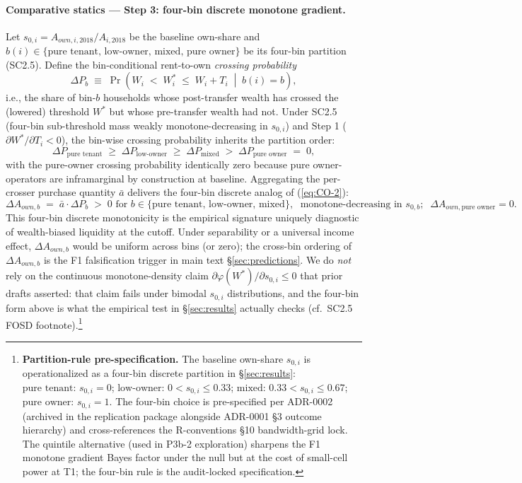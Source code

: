 \documentclass[11pt, a4paper]{article}
\begin{document}
\paragraph{Comparative statics --- Step 3: four-bin discrete monotone gradient.}
Let $s_{0,i} = A_{own,i,2018}/A_{i,2018}$ be the baseline own-share and
$b(i) \in \{\text{pure tenant},\, \text{low-owner},\, \text{mixed},\, \text{pure owner}\}$
be its four-bin partition (SC2.5). Define the bin-conditional rent-to-own
\emph{crossing probability}
\[
\Delta P_b \;\equiv\; \Pr\!\left(W_i \;<\; W_i^* \;\le\; W_i + T_i \;\middle|\; b(i) = b\right),
\]
i.e., the share of bin-$b$ households whose post-transfer wealth has crossed
the (lowered) threshold $W^*$ but whose pre-transfer wealth had not. Under
SC2.5 (four-bin sub-threshold mass weakly monotone-decreasing in $s_{0,i}$)
and Step 1 ($\partial W^*/\partial T_i < 0$), the bin-wise crossing
probability inherits the partition order:
\begin{equation}
\Delta P_{\text{pure tenant}} \;\ge\; \Delta P_{\text{low-owner}}
\;\ge\; \Delta P_{\text{mixed}} \;>\; \Delta P_{\text{pure owner}} \;=\; 0,
\label{eq:appB-step3-prob}
\end{equation}
with the pure-owner crossing probability identically zero because pure
owner-operators are inframarginal by construction at baseline. Aggregating
the per-crosser purchase quantity $\bar a$ delivers the four-bin discrete
analog of (\ref{eq:CO-2}):
\begin{equation}
\boxed{\Delta A_{own,b} \;=\; \bar a \cdot \Delta P_b \;>\; 0
  \text{ for } b \in \{\text{pure tenant},\, \text{low-owner},\, \text{mixed}\},
  \;\text{ monotone-decreasing in } s_{0,b};\;\;
  \Delta A_{own,\text{pure owner}} = 0.}
\label{eq:appB-step3}
\end{equation}
This four-bin discrete monotonicity is the empirical signature uniquely
diagnostic of wealth-biased liquidity at the cutoff. Under separability or a
universal income effect, $\Delta A_{own,b}$ would be uniform across bins (or
zero); the cross-bin ordering of $\Delta A_{own,b}$ is the F1 falsification
trigger in main text \S\ref{sec:predictions}. We do \emph{not} rely on the
continuous monotone-density claim $\partial \varphi(W^*)/\partial s_{0,i} \le 0$
that prior drafts asserted: that claim fails under bimodal $s_{0,i}$
distributions, and the four-bin form above is what the empirical test in
\S\ref{sec:results} actually checks (cf.\ SC2.5 FOSD footnote).\footnote{\textbf{Partition-rule
pre-specification.} The baseline own-share $s_{0,i}$ is operationalized as a
four-bin discrete partition in \S\ref{sec:results}:
$\text{pure tenant: } s_{0,i} = 0$;
$\text{low-owner: } 0 < s_{0,i} \le 0.33$;
$\text{mixed: } 0.33 < s_{0,i} \le 0.67$;
$\text{pure owner: } s_{0,i} = 1$. The four-bin choice is pre-specified per
ADR-0002 (archived in the replication package alongside ADR-0001 \S 3 outcome
hierarchy) and cross-references the R-conventions \S 10 bandwidth-grid lock.
The quintile alternative (used in P3b-2 exploration) sharpens the F1 monotone
gradient Bayes factor under the null but at the cost of small-cell power at
T1; the four-bin rule is the audit-locked specification.}
\end{document}
